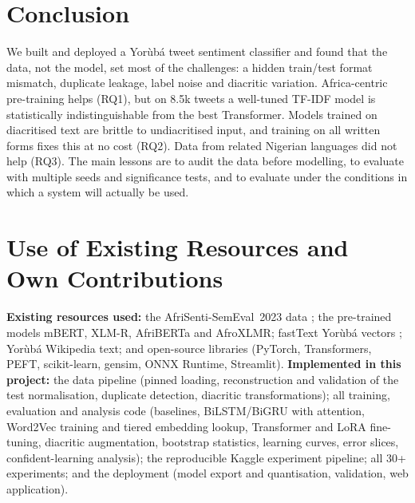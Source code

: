 \documentclass[11pt]{article}
\begin{document}
\section{Conclusion}
We built and deployed a Yorùbá tweet sentiment classifier and found that the data, not the model, set most of the challenges: a hidden train/test format mismatch, duplicate leakage, label noise and diacritic variation. Africa-centric pre-training helps (RQ1), but on 8.5k tweets a well-tuned TF-IDF model is statistically indistinguishable from the best Transformer. Models trained on diacritised text are brittle to undiacritised input, and training on all written forms fixes this at no cost (RQ2). Data from related Nigerian languages did not help (RQ3). The main lessons are to audit the data before modelling, to evaluate with multiple seeds and significance tests, and to evaluate under the conditions in which a system will actually be used.

\section*{Use of Existing Resources and Own Contributions}
\textbf{Existing resources used:} the AfriSenti-SemEval~2023 data \citep{muhammad-etal-2023-afrisenti}; the pre-trained models mBERT, XLM-R, AfriBERTa and AfroXLMR; fastText Yorùbá vectors \citep{grave-etal-2018-learning}; Yorùbá Wikipedia text; and open-source libraries (PyTorch, Transformers, PEFT, scikit-learn, gensim, ONNX Runtime, Streamlit). \textbf{Implemented in this project:} the data pipeline (pinned loading, reconstruction and validation of the test normalisation, duplicate detection, diacritic transformations); all training, evaluation and analysis code (baselines, BiLSTM/BiGRU with attention, Word2Vec training and tiered embedding lookup, Transformer and LoRA fine-tuning, diacritic augmentation, bootstrap statistics, learning curves, error slices, confident-learning analysis); the reproducible Kaggle experiment pipeline; all 30+ experiments; and the deployment (model export and quantisation, validation, web application).



\end{document}
